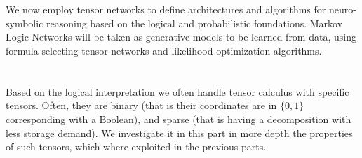 \documentclass[aps,onecolumn,nofootinbib,pra]{article}
\begin{document}
    \part{\parttwotext}\label{par:two}

    We now employ tensor networks to define architectures and algorithms for neuro-symbolic reasoning based on the logical and probabilistic foundations.
    Markov Logic Networks will be taken as generative models to be learned from data, using formula selecting tensor networks and likelihood optimization algorithms.

    

    
    

    

    


    \part{\partthreetext}\label{par:three}

    Based on the logical interpretation we often handle tensor calculus with specific tensors.
    Often, they are binary (that is their coordinates are in $\{0,1\}$ corresponding with a Boolean), and sparse (that is having a decomposition with less storage demand).
    We investigate it in this part in more depth the properties of such tensors, which where exploited in the previous parts.

    
    

    

    

    




    \appendix
    

    
    
\end{document}
